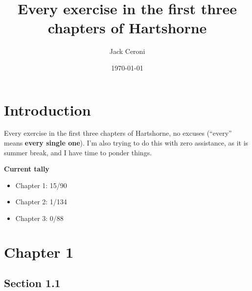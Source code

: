 \documentclass[aps,pra,showpacs,notitlepage,onecolumn,superscriptaddress,nofootinbib]{revtex4-1}
\theoremstyle{definition}
\begin{document}
\title{Every exercise in the first three chapters of Hartshorne}
\author{Jack Ceroni}
\date{\today}
\maketitle

\tableofcontents

\section{Introduction}

\noindent Every exercise in the first three chapters of Hartshorne, no excuses (``every'' means \textbf{every single one}). I'm also trying to do this with zero assistance, as
it is summer break, and I have time to ponder things.
\newline

\noindent \textbf{Current tally}
\begin{itemize}
  \item Chapter 1: 15/90
    \item Chapter 2: 1/134
      \item Chapter 3: 0/88
  \end{itemize}

\section{Chapter 1}

\subsection{Section 1.1}
\end{document}
